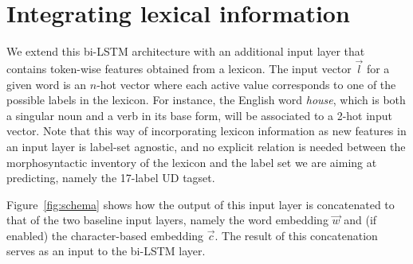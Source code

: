 \documentclass[11pt,letterpaper]{article}
\begin{document}
\section{Integrating lexical information}

We extend this bi-LSTM architecture with an additional input layer that
contains token-wise features obtained from a lexicon. The input vector $\vec{l}$ for a given word is an $n$-hot vector
where each active value corresponds to one of the possible labels in the lexicon. For instance, the English word
\textit{house}, which is both a singular noun and a verb in its base form, will be associated to a 2-hot input
vector.  Note that this way of incorporating lexicon information as new features in an input layer is label-set
agnostic, and no explicit relation is needed between the morphosyntactic inventory of the lexicon and the label set we
are aiming at predicting, namely the 17-label UD tagset.

Figure~\ref{fig:schema} shows how the output of this input layer is concatenated to that of the two baseline input
layers, namely the word embedding $\vec{w}$ and (if enabled) the character-based embedding $\vec{c}$. The result of this
concatenation serves as an input to the bi-LSTM layer.

\end{document}

